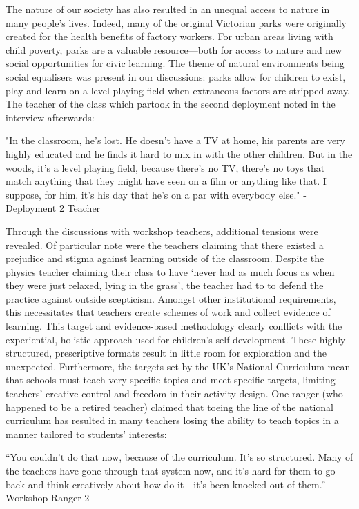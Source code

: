 The nature of our society has also resulted in an unequal access to nature in many people’s lives. Indeed, many of the original Victorian parks were originally created for the health benefits of factory workers. For urban areas living with child poverty, parks are a valuable resource—both for access to nature and new social opportunities for civic learning. The theme of natural environments being social equalisers was present in our discussions: parks allow for children to exist, play and learn on a level playing field when extraneous factors are stripped away. The teacher of the class which partook in the second deployment noted in the interview afterwards:

\begin{displayquote}
"In the classroom, he's lost. He doesn't have a TV at home, his parents are very highly educated and he finds it hard to mix in with the other children. But in the woods, it's a level playing field, because there's no TV, there's no toys that match anything that they might have seen on a film or anything like that. I suppose, for him, it’s his day that he’s on a par with everybody else." - Deployment 2 Teacher
\end{displayquote}

Through the discussions with workshop teachers, additional tensions were revealed. Of particular note were the teachers claiming that there existed a prejudice and stigma against learning outside of the classroom. Despite the physics teacher claiming their class to have `never had as much focus as when they were just relaxed, lying in the grass', the teacher had to to defend the practice against outside scepticism. Amongst other institutional requirements, this necessitates that teachers create schemes of work and collect evidence of learning. This target and evidence-based methodology clearly conflicts with the experiential, holistic approach used for children’s self-development. These highly structured, prescriptive formats result in little room for exploration and the unexpected. Furthermore, the targets set by the UK’s National Curriculum mean that schools must teach very specific topics and meet specific targets, limiting teachers’ creative control and freedom in their activity design. One ranger (who happened to be a retired teacher) claimed that toeing the line of the national curriculum has resulted in many teachers losing the ability to teach topics in a manner tailored to students’ interests:

\begin{displayquote}
“You couldn't do that now, because of the curriculum. It’s so structured. Many of the teachers have gone through that system now, and it’s hard for them to go back and think creatively about how do it---it’s been knocked out of them.” - Workshop Ranger 2
\end{displayquote}

